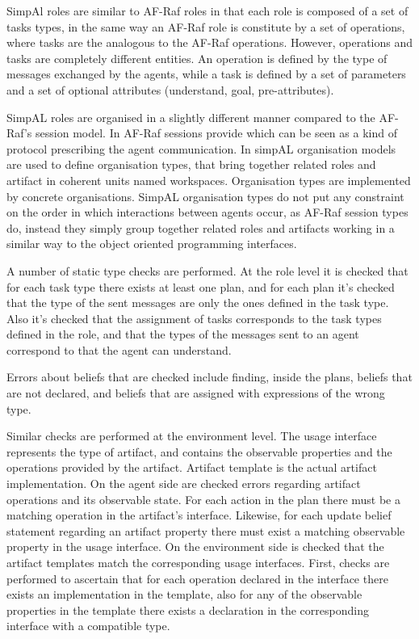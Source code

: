 \documentclass[a4paper,12pt,oneside,fleqn]{book} %
\begin{document}
SimpAl roles are similar to AF-Raf roles in that each role is composed of a
set of tasks types, in the same way an AF-Raf role is constitute by a set
of operations, where tasks are the analogous to the AF-Raf operations.
However, operations and tasks are completely different entities. An
operation is defined by the type of messages exchanged by the agents, while
a task is defined by a set of parameters and a set of optional attributes
(understand, goal, pre-attributes).

SimpAL roles are organised in a slightly different manner compared to the
AF-Raf's session model. In AF-Raf sessions provide  which can be seen as a kind of protocol
prescribing the agent communication. In simpAL organisation models are used
to define organisation types, that bring together related roles and
artifact in coherent units named workspaces. Organisation types are
implemented by concrete organisations. SimpAL organisation types do not put
any constraint on the order in which interactions between agents occur, as
AF-Raf session types do, instead they simply group together related roles
and artifacts working in a similar way to the object oriented programming
interfaces.

A number of static type checks are performed. At the role level it is
checked that for each task type there exists at least one plan, and for
each plan it's checked that the type of the sent messages are only the ones
defined in the task type. Also it's checked that the assignment of tasks
corresponds to the task types defined in the role, and that the types of
the messages sent to an agent correspond to that the agent can understand.

Errors about beliefs that are checked include finding, inside the plans,
beliefs that are not declared, and beliefs that are assigned with
expressions of the wrong type.

Similar checks are performed at the environment level. The usage interface
represents the type of artifact, and contains the observable properties and
the operations provided by the artifact. Artifact template is the actual
artifact implementation. On the agent side are checked errors regarding
artifact operations and its observable state. For each action in the plan
there must be a matching operation in the artifact's interface.  Likewise,
for each update belief statement regarding an artifact property there must
exist a matching observable property in the usage interface. On the
environment side is checked that the artifact templates match the
corresponding usage interfaces. First, checks are performed to ascertain
that for each operation declared in the interface there exists an
implementation in the template, also for any of the observable properties
in the template there exists a declaration in the corresponding interface
with a compatible type.
\end{document}
